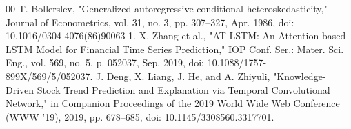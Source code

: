 \documentclass[conference]{IEEEtran}
\begin{document}
\begin{thebibliography}{00}
     T. Bollerslev, "Generalized autoregressive conditional heteroskedasticity," Journal of Econometrics, vol. 31, no. 3, pp. 307–327, Apr. 1986, doi: 10.1016/0304-4076(86)90063-1.
     X. Zhang et al., "AT-LSTM: An Attention-based LSTM Model for Financial Time Series Prediction," IOP Conf. Ser.: Mater. Sci. Eng., vol. 569, no. 5, p. 052037, Sep. 2019, doi: 10.1088/1757-899X/569/5/052037.
     J. Deng, X. Liang, J. He, and A. Zhiyuli, "Knowledge-Driven Stock Trend Prediction and Explanation via Temporal Convolutional Network," in Companion Proceedings of the 2019 World Wide Web Conference (WWW '19), 2019, pp. 678–685, doi: 10.1145/3308560.3317701.

\end{thebibliography}
\end{document}
